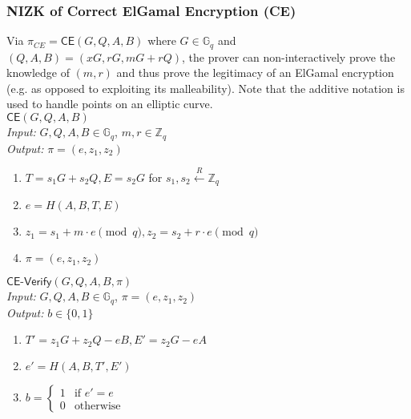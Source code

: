 \documentclass[conference]{IEEEtran}
\theoremstyle{definition}
\theoremstyle{remark}
\begin{document}
\subsubsection{NIZK of Correct ElGamal Encryption (CE)}
\label{appendix:ce}
Via $\pi_{CE} = \mathsf{CE}(G, Q, A, B)$ \cite{cherniaeva2019homomorphic} where $G \in \mathbb{G}_q$ and $(Q, A, B) = (x G, r G, m G + r Q)$, the prover can non-interactively prove the knowledge of $(m, r)$ and thus prove the legitimacy of an ElGamal encryption (e.g. as opposed to exploiting its malleability). Note that the additive notation is used to handle points on an elliptic curve.\\

\noindent\underline{$\mathsf{CE}(G, Q, A, B)$}\\
\textit{Input:} $G, Q, A, B \in \mathbb{G}_q$, $m, r \in \mathbb{Z}_q$\\
\textit{Output:} $\pi = (e, z_1, z_2)$
\vspace{-\topsep}
\begin{enumerate}
\item $T = s_1 G + s_2 Q, E = s_2 G$ for $s_1, s_2 \xleftarrow{R} \mathbb{Z}_q$
\item $e = H(A, B, T, E)$
\item $z_1 = s_1 + m \cdot e \pmod q, z_2 = s_2 + r \cdot e \pmod q$
\item $\pi = (e, z_1, z_2)$
\end{enumerate}

\noindent\underline{$\mathsf{CE}\text{-}\mathsf{Verify}(G, Q, A, B, \pi)$}\\
\textit{Input:} $G, Q, A, B \in \mathbb{G}_q$, $\pi = (e, z_1, z_2)$\\
\textit{Output:} $b \in \{0, 1\}$
\vspace{-\topsep}
\begin{enumerate}
\item $T' = z_1 G + z_2 Q - e B, E' = z_2 G - e A$
\item $e' = H(A, B, T', E')$
\item $b = \begin{cases}
1 & \text{if $e' = e$}\\
0 & \text{otherwise}
\end{cases}$
\end{enumerate}
\end{document}
